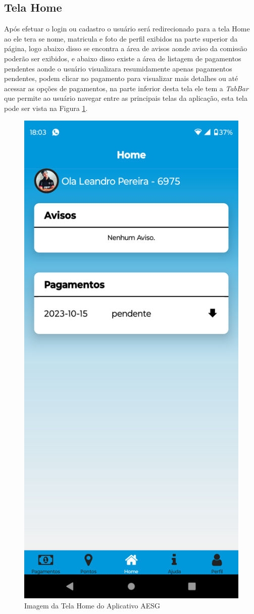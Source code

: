 \documentclass[
    12pt,                   %
    openright,              %
    oneside,                %
    a4paper,                %
    sumario=tradicional,    %
    english,                %
    brazil,                 %
    ]{abntex2}
\begin{document}
        \subsection{Tela Home}
            Após efetuar o login ou cadastro o usuário será redirecionado para a tela Home ao ele tera se nome, matricula e foto de perfil exibidos na parte superior da página, logo abaixo disso se encontra a área de avisos aonde aviso da comissão poderão ser exibidos, e abaixo disso existe a área de listagem de pagamentos pendentes aonde o usuário visualizara resumidamente apenas pagamentos pendentes, podem clicar no pagamento para visualizar mais detalhes ou até acessar as opções de pagamentos, na parte inferior desta tela ele tem a \textit{TabBar} que permite ao usuário navegar entre as principais telas da aplicação, esta tela pode ser vista na Figura \ref{fig:AppTelaHome}.

            \begin{figure}[!h]
                \begin{center}
                \centering
                \includegraphics[width=0.4\linewidth]{Imagens/App Images User/AUHome.png}
                \end{center}
                \caption[Imagem da Tela Home do Aplicativo AESG]{ 
                Imagem da Tela Home do Aplicativo AESG}
                \label{fig:AppTelaHome}
            \end{figure}
\end{document}
